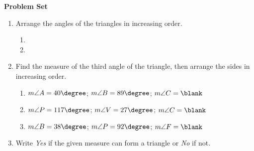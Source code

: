 \def\figdir{/storage/emulated/0/Documents/documents/latex/1920/Grade-8/3rd/inequalities-in-one-triangle/f}


\textbf{Problem Set}

\vspce

\begin{enumerate}[label = \Alph*. ]
\item \hspce Arrange the angles of the triangles in increasing order. 

\begin{multicols}{2}

\begin{enumerate}[label = \arabic*. ]
\item 
\item 
\end{enumerate} 

\end{multicols} 
\item \hspce Find the measure of the third angle of the triangle, then arrange the sides in increasing order. 

\begin{enumerate}[label = \arabic*. ]
\item $m\angle{A} = 40\degree$; $ m\angle{B} = 89\degree$; $ m\angle{C} = \blank$
\item $m\angle{P} = 117\degree$; $ m\angle{V} = 27\degree$; $ m\angle{C} = \blank$
\item $m\angle{B} = 38\degree$; $ m\angle{P} = 92\degree$; $ m\angle{F} = \blank$
\end{enumerate} 
\item \hspce Write \emph{Yes} if the given measure can form a triangle or \emph{No} if not. 

\vspace*{-0.75ex}

\begin{multicols}{3}


\end{multicols}
\end{enumerate}
